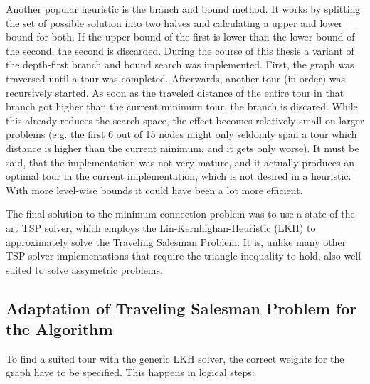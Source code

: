Another popular heuristic is the branch and bound method. It works by splitting the set of possible solution into two halves and calculating a upper and lower bound for both. If the upper bound of the first is lower than the lower bound of the second, the second is discarded. During the course of this thesis a variant of the depth-first branch and bound search was implemented. First, the graph was traversed until a tour was completed. Afterwards, another tour (in order) was recursively started. As soon as the traveled distance of the entire tour in that branch got higher than the current minimum tour, the branch is discared. While this already reduces the search space, the effect becomes relatively small on larger problems (e.g. the first 6 out of 15 nodes might only seldomly span a tour which distance is higher than the current minimum, and it gets only worse).  It must be said, that the implementation was not very mature, and it actually produces an optimal tour in the current implementation, which is not desired in a heuristic. With more level-wise bounds it could have been a lot more efficient. 

The final solution to the minimum connection problem was to use a state of the art TSP solver\cite{helsgaun2000effective}, which employs the Lin-Kernhighan-Heuristic\cite{kernighan1970efficient} (LKH) to approximately solve the Traveling Salesman Problem. It is, unlike many other TSP solver implementations that require the triangle inequality to hold, also well suited to solve assymetric problems.
\subsection{Adaptation of Traveling Salesman Problem for the Algorithm}

To find a suited tour with the generic LKH solver, the correct weights for the graph have to be specified. This happens in logical steps:

